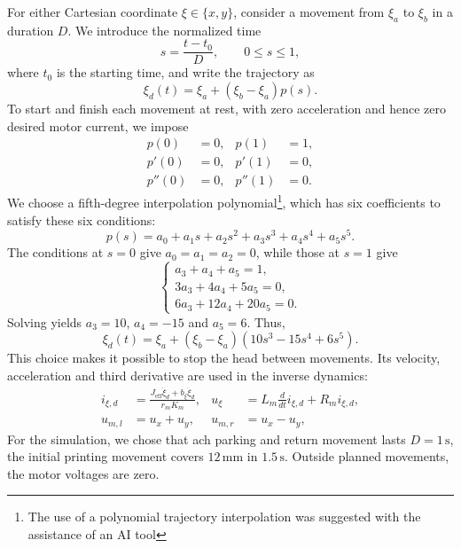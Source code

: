 \documentclass[a4paper,12pt]{article}
\begin{document}
For either Cartesian coordinate $\xi\in\{x,y\}$, consider a movement from $\xi_a$ to $\xi_b$ in a duration $D$. We introduce the normalized time
\begin{equation}
s=\frac{t-t_0}{D},\qquad 0\leq s\leq1,
\end{equation}
where $t_0$ is the starting time, and write the trajectory as
\begin{equation}
\xi_d(t)=\xi_a+(\xi_b-\xi_a)p(s).
\end{equation}
To start and finish each movement at rest, with zero acceleration and hence zero desired motor current, we impose
\begin{equation}
\begin{aligned}
p(0)&=0, & p(1)&=1,\\
p'(0)&=0, & p'(1)&=0,\\
p''(0)&=0, & p''(1)&=0.
\end{aligned}
\end{equation}
We choose a fifth-degree interpolation polynomial\footnote{The use of a polynomial trajectory interpolation was suggested with the assistance of an AI tool}, which has six coefficients to satisfy these six conditions:
\begin{equation}
p(s)=a_0+a_1s+a_2s^2+a_3s^3+a_4s^4+a_5s^5.
\end{equation}
The conditions at $s=0$ give $a_0=a_1=a_2=0$, while those at $s=1$ give
\begin{equation}
\begin{cases}
a_3+a_4+a_5=1,\\
3a_3+4a_4+5a_5=0,\\
6a_3+12a_4+20a_5=0.
\end{cases}
\end{equation}
Solving yields $a_3=10$, $a_4=-15$ and $a_5=6$. Thus,
\begin{equation}
\boxed{\xi_d(t)=\xi_a+(\xi_b-\xi_a)(10s^3-15s^4+6s^5).}
\end{equation}
This choice makes it possible to stop the head between movements. Its velocity, acceleration and third derivative are used in the inverse dynamics:
\begin{equation}
\begin{aligned}
i_{\xi,d}&=\frac{J_{\mathrm{eff}}\ddot\xi_d+b_\xi\dot\xi_d}{r_mK_m},
&u_\xi&=L_m\frac{d}{dt}i_{\xi,d}+R_mi_{\xi,d},\\
u_{m,l}&=u_x+u_y,
&u_{m,r}&=u_x-u_y,
\end{aligned}
\end{equation}
For the simulation, we chose that ach parking and return movement lasts $D=1\,\mathrm{s}$, the initial printing movement covers $12\,\mathrm{mm}$ in $1.5\,\mathrm{s}$. Outside planned movements, the motor voltages are zero.
\end{document}
